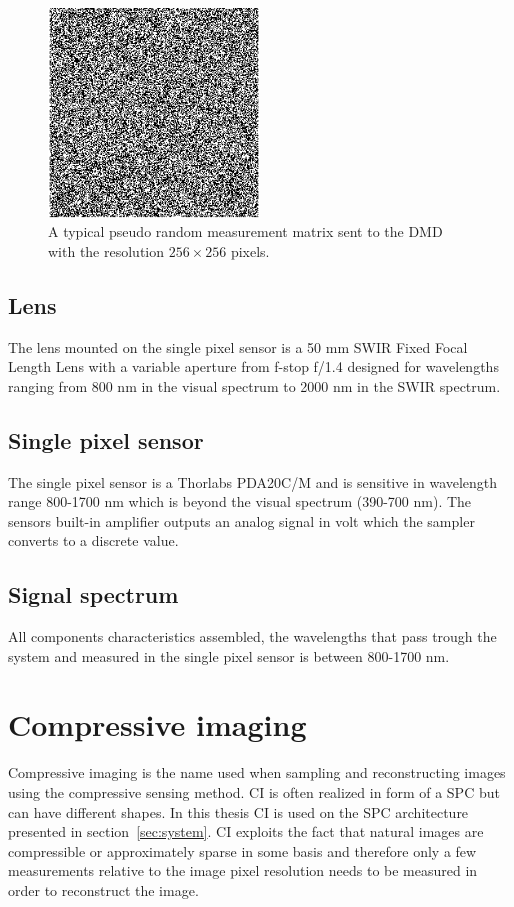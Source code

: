 \begin{figure}[H]
    \centering
    \includegraphics[width = 0.5\textwidth]{gfx/DMD_pattern.png}
    \caption{A typical pseudo random measurement matrix sent to the DMD with the resolution $256 \times 256$ pixels.}
    \label{fig:dmd_pattern}
\end{figure}



\subsection{Lens}
The lens mounted on the single pixel sensor is a 50 mm SWIR Fixed Focal Length Lens with a variable aperture from f-stop f/1.4 designed for wavelengths ranging from 800 nm in the visual spectrum to 2000 nm in the SWIR spectrum. \cite{website:SWIR_objective}

\subsection{Single pixel sensor}
The single pixel sensor is a Thorlabs PDA20C/M and is sensitive in wavelength range 800-1700 nm which is beyond the visual spectrum (390-700 nm). The sensors built-in amplifier outputs an analog signal in volt which the sampler converts to a discrete value. \cite{manual:PDA}

\subsection{Signal spectrum}
All components characteristics assembled, the wavelengths that pass trough the system and measured in the single pixel sensor is between 800-1700 nm.



\section{Compressive imaging}
\label{sec:CI}
Compressive imaging is the name used when sampling and reconstructing images using the compressive sensing method. CI is often realized in form of a SPC but can have different shapes. In this thesis CI is used on the SPC architecture presented in section~\ref{sec:system}. CI exploits the fact that natural images are compressible or approximately sparse in some basis and therefore only a few measurements relative to the image pixel resolution needs to be measured in order to reconstruct the image.\\[0.1in]

